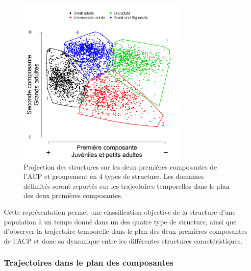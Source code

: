 \begin{figure}[!ht]
\begin{center}
\includegraphics[width=0.75\textwidth]{1_CorpsDeThese/Resumes/Fig/SP03b}
\caption[Projection des données
sur les deux premières composantes]{Projection des structures sur les deux
premières composantes de l'ACP et groupement en 4 types de structure. Les
domaines délimités seront reportés sur les trajectoires temporelles dans le
plan des deux premières composantes.}
\label{fig:SP3}
\end{center}
\end{figure}

Cette représentation permet une classification objective de la structure d'une
population à un temps donné dans un des quatre type de structure, ainsi que
d'observer la trajectoire temporelle dans le plan des deux premières composantes
de l'ACP et donc sa dynamique entre les différentes structures caractéristiques. 

\subsubsection{Trajectoires dans le plan des composantes}

